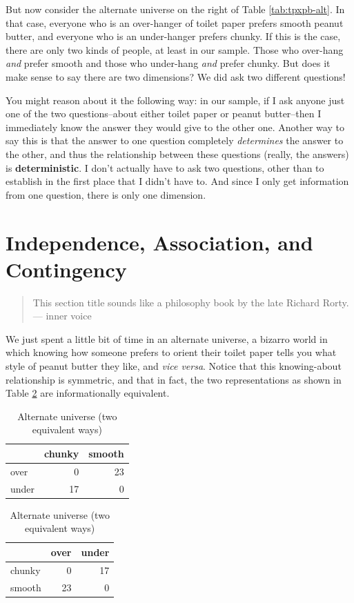 \documentclass[openany]{book}
\begin{document}
But now consider the alternate universe on the right of Table \ref{tab:tpxpb-alt}. In that case, everyone who is an over-hanger of toilet paper prefers smooth peanut butter, and everyone who is an under-hanger prefers chunky. If this is the case, there are only two kinds of people, at least in our sample. Those who over-hang \emph{and} prefer smooth and those who under-hang \emph{and} prefer chunky. But does it make sense to say there are two dimensions? We did ask two different questions!

You might reason about it the following way: in our sample, if I ask anyone just one of the two questions--about either toilet paper or peanut butter--then I immediately know the answer they would give to the other one. Another way to say this is that the answer to one question completely \emph{determines} the answer to the other, and thus the relationship between these questions (really, the answers) is \textbf{deterministic}. I don't actually have to ask two questions, other than to establish in the first place that I didn't have to. And since I only get information from one question, there is only one dimension.

\hypertarget{independence-association-and-contingency}{%
\section*{Independence, Association, and Contingency}\label{independence-association-and-contingency}}

\begin{quote}
This section title sounds like a philosophy book by the late Richard Rorty.
--- inner voice
\end{quote}

We just spent a little bit of time in an alternate universe, a bizarro world in which knowing how someone prefers to orient their toilet paper tells you what style of peanut butter they like, and \emph{vice versa}. Notice that this knowing-about relationship is symmetric, and that in fact, the two representations as shown in Table \ref{tab:tpxpb-alt2way} are informationally equivalent.

\begin{table}[!h]
\caption{\label{tab:tpxpb-alt2way}Alternate universe (two equivalent ways)}

\centering
\begin{tabular}[t]{lrr}
\toprule
  & chunky & smooth\\
\midrule
over & 0 & 23\\
under & 17 & 0\\
\bottomrule
\end{tabular}
\centering
\begin{tabular}[t]{lrr}
\toprule
  & over & under\\
\midrule
chunky & 0 & 17\\
smooth & 23 & 0\\
\bottomrule
\end{tabular}
\end{table}
\end{document}
